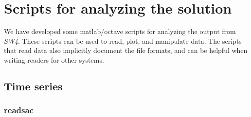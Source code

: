 \documentclass[11pt]{report}
\begin{document}



\chapter{Scripts for analyzing the solution}\label{chap:scripts}

We have developed some matlab/octave scripts for analyzing the output from \emph{SW4}. These scripts
can be used to read, plot, and manipulate data. The scripts that read data also implicitly document
the file formats, and can be helpful when writing readers for other systems.

\section{Time series}
\subsection{readsac}
\end{document}

